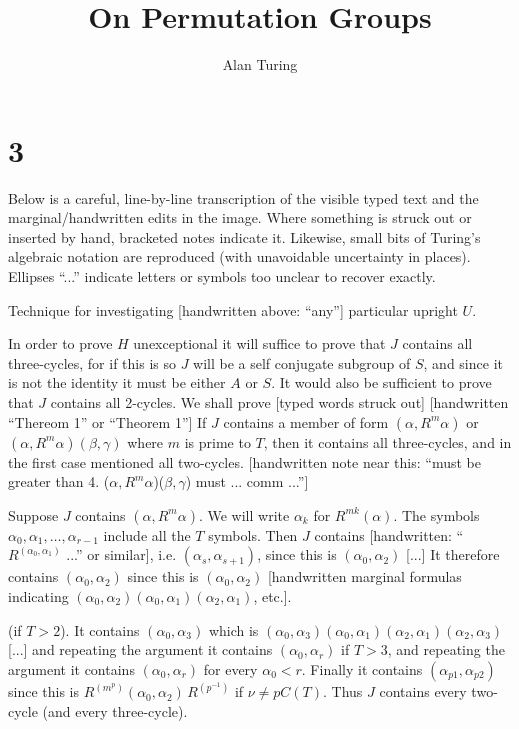 \documentclass[12pt]{article}
\title{On Permutation Groups}
\author{Alan Turing}
\date{} %
\begin{document}
\maketitle

\section{3}

Below is a careful, line-by-line transcription of the visible typed text and the marginal/handwritten edits in the image. 
Where something is struck out or inserted by hand, bracketed notes indicate it. 
Likewise, small bits of Turing's algebraic notation are reproduced (with unavoidable uncertainty in places). 
Ellipses ``...'' indicate letters or symbols too unclear to recover exactly.

\bigskip

Technique for investigating [handwritten above: ``any''] particular upright \(U\).

In order to prove \(H\) unexceptional it will suffice to prove
that \(J\) contains all three-cycles, for if this is so \(J\) will
be a self conjugate subgroup of \(S\), and since it is not the
identity it must be either \(A\) or \(S\). It would also be sufficient
to prove that \(J\) contains all 2-cycles. We shall prove [typed words struck out]
[handwritten ``Thereom 1'' or ``Theorem 1''] If \(J\) contains a member of form \((\alpha, R^m \alpha)\)
or \((\alpha, R^m \alpha)(\beta, \gamma)\) where \(m\) is prime to \(T\), then it
contains all three-cycles, and in the first case mentioned
all two-cycles. [handwritten note near this: ``must be greater than 4.
(\(\alpha, R^m \alpha\))(\(\beta,\gamma\)) must ... comm ...'']

\bigskip

Suppose \(J\) contains \((\alpha, R^m \alpha)\). We will write \(\alpha_k\)
for \(R^{m k}(\alpha)\). The symbols \(\alpha_0, \alpha_1, \ldots, \alpha_{r-1}\) include
all the \(T\) symbols. Then \(J\) contains
[handwritten: ``\(R^{(\alpha_0, \alpha_1)}\) ...'' or similar], i.e. \((\alpha_s, \alpha_{s+1})\), since this is
\((\alpha_0, \alpha_2)\) [...] It therefore contains \((\alpha_0, \alpha_2)\) since this
is \((\alpha_0, \alpha_2)\) [handwritten marginal formulas indicating
\((\alpha_0, \alpha_2)(\alpha_0, \alpha_1)(\alpha_2, \alpha_1)\), etc.].

\bigskip

(if \(T > 2\)). It contains \((\alpha_0, \alpha_3)\) which is
\((\alpha_0, \alpha_3)(\alpha_0, \alpha_1)(\alpha_2, \alpha_1)(\alpha_2, \alpha_3)\) [...]
and repeating the argument it contains \((\alpha_0, \alpha_r)\)
if \(T > 3\), and repeating the argument it contains
\((\alpha_0, \alpha_r)\) for every \(\alpha_0 < r\). Finally it contains
\((\alpha_{p1}, \alpha_{p2})\) since this is \(R^{(m^p)}(\alpha_0, \alpha_2)\, R^{(p^{-1})}\)
if \(\nu \neq pC(T)\). Thus \(J\) contains every
two-cycle (and every three-cycle).
\end{document}
